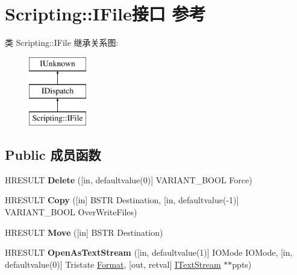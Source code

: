 \hypertarget{interface_scripting_1_1_i_file}{}\section{Scripting\+:\+:I\+File接口 参考}
\label{interface_scripting_1_1_i_file}
类 Scripting\+:\+:I\+File 继承关系图\+:\begin{figure}[H]
\begin{center}
\leavevmode
\includegraphics[height=3.000000cm]{interface_scripting_1_1_i_file}
\end{center}
\end{figure}
\subsection*{Public 成员函数}
\begin{DoxyCompactItemize}
\item 
\mbox{\label{interface_scripting_1_1_i_file_a954c26034f1bfac971d0a532b7ee2e5b}} 
H\+R\+E\+S\+U\+LT {\bfseries Delete} (\mbox{[}in, defaultvalue(0)\mbox{]} V\+A\+R\+I\+A\+N\+T\+\_\+\+B\+O\+OL Force)
\item 
\mbox{\label{interface_scripting_1_1_i_file_aac0dd52a744a287025846bd9eecd0dc7}} 
H\+R\+E\+S\+U\+LT {\bfseries Copy} (\mbox{[}in\mbox{]} B\+S\+TR Destination, \mbox{[}in, defaultvalue(-\/1)\mbox{]} V\+A\+R\+I\+A\+N\+T\+\_\+\+B\+O\+OL Over\+Write\+Files)
\item 
\mbox{\label{interface_scripting_1_1_i_file_aeba52252ca8b52e9b1761b48bb341ea0}} 
H\+R\+E\+S\+U\+LT {\bfseries Move} (\mbox{[}in\mbox{]} B\+S\+TR Destination)
\item 
\mbox{\label{interface_scripting_1_1_i_file_a702876d8cc1ffe8c94b0c0a9dc895bc4}} 
H\+R\+E\+S\+U\+LT {\bfseries Open\+As\+Text\+Stream} (\mbox{[}in, defaultvalue(1)\mbox{]} I\+O\+Mode I\+O\+Mode, \mbox{[}in, defaultvalue(0)\mbox{]} Tristate \hyperlink{struct_format}{Format}, \mbox{[}out, retval\mbox{]} \hyperlink{interface_scripting_1_1_i_text_stream}{I\+Text\+Stream} $\ast$$\ast$ppts)
\end{DoxyCompactItemize}
